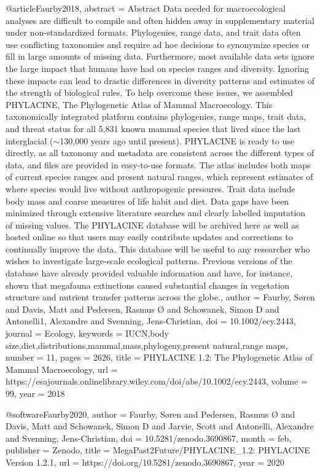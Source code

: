 {{{{{@article{Faurby2018,
abstract = {Abstract Data needed for macroecological analyses are difficult to compile and often hidden away in supplementary material under non-standardized formats. Phylogenies, range data, and trait data often use conflicting taxonomies and require ad hoc decisions to synonymize species or fill in large amounts of missing data. Furthermore, most available data sets ignore the large impact that humans have had on species ranges and diversity. Ignoring these impacts can lead to drastic differences in diversity patterns and estimates of the strength of biological rules. To help overcome these issues, we assembled PHYLACINE, The Phylogenetic Atlas of Mammal Macroecology. This taxonomically integrated platform contains phylogenies, range maps, trait data, and threat status for all 5,831 known mammal species that lived since the last interglacial ($\sim$130,000 years ago until present). PHYLACINE is ready to use directly, as all taxonomy and metadata are consistent across the different types of data, and files are provided in easy-to-use formats. The atlas includes both maps of current species ranges and present natural ranges, which represent estimates of where species would live without anthropogenic pressures. Trait data include body mass and coarse measures of life habit and diet. Data gaps have been minimized through extensive literature searches and clearly labelled imputation of missing values. The PHYLACINE database will be archived here as well as hosted online so that users may easily contribute updates and corrections to continually improve the data. This database will be useful to any researcher who wishes to investigate large-scale ecological patterns. Previous versions of the database have already provided valuable information and have, for instance, shown that megafauna extinctions caused substantial changes in vegetation structure and nutrient transfer patterns across the globe.},
author = {Faurby, S{\o}ren and Davis, Matt and Pedersen, Rasmus {\O} and Schowanek, Simon D and Antonelli1, Alexandre and Svenning, Jens-Christian},
doi = {10.1002/ecy.2443},
journal = {Ecology},
keywords = {IUCN,body size,diet,distributions,mammal,mass,phylogeny,present natural,range maps},
number = {11},
pages = {2626},
title = {{PHYLACINE 1.2: The Phylogenetic Atlas of Mammal Macroecology}},
url = {https://esajournals.onlinelibrary.wiley.com/doi/abs/10.1002/ecy.2443},
volume = {99},
year = {2018}
}

@software{Faurby2020,
author = {Faurby, S{\o}ren and Pedersen, Rasmus {\O} and Davis, Matt and Schowanek, Simon D and Jarvie, Scott and Antonelli, Alexandre and Svenning, Jens-Christian},
doi = {10.5281/zenodo.3690867},
month = {feb},
publisher = {Zenodo},
title = {{MegaPast2Future/PHYLACINE\_1.2: PHYLACINE Version 1.2.1}},
url = {https://doi.org/10.5281/zenodo.3690867},
year = {2020}
}

}}}}}
